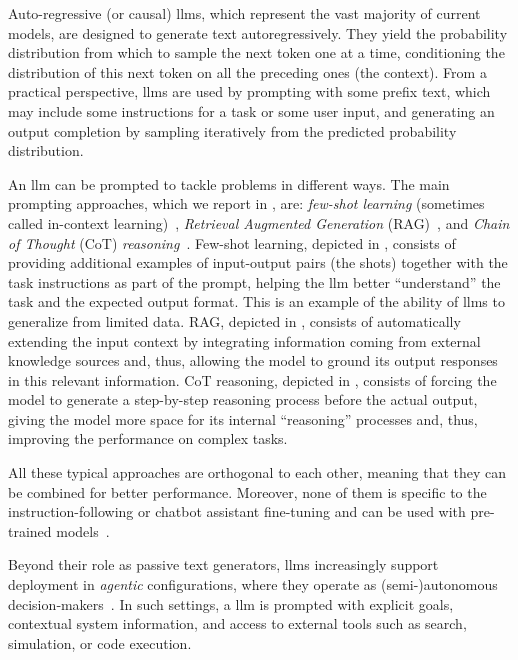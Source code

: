 \documentclass[manuscript,screen]{acmart}
\begin{document}

Auto-regressive (or causal) \acp{llm}, which represent the vast majority of current models, are designed to generate text autoregressively.
They yield the probability distribution from which to sample the next token one at a time, conditioning the distribution of this next token on all the preceding ones (the context).
From a practical perspective, \acp{llm} are used by prompting with some prefix text, which may include some instructions for a task or some user input, and generating an output completion by sampling iteratively from the predicted probability distribution.

An \ac{llm} can be prompted to tackle problems in different ways.
The main prompting approaches, which we report in , are:
\emph{few-shot learning} (sometimes called in-context learning)~\cite{DBLP:conf/nips/BrownMRSKDNSSAA20},
\emph{Retrieval Augmented Generation} (RAG)~\cite{DBLP:journals/corr/abs-2312-10997}, and
\emph{Chain of Thought} (CoT) \emph{reasoning}~\cite{DBLP:conf/nips/KojimaGRMI22}.
Few-shot learning, depicted in , consists of providing additional examples of input-output pairs (the shots) together with the task instructions as part of the prompt, helping the \ac{llm} better \enquote{understand} the task and the expected output format.
This is an example of the ability of \acp{llm} to generalize from limited data.
RAG, depicted in , consists of automatically extending the input context by integrating information coming from external knowledge sources and, thus, allowing the model to ground its output responses in this relevant information.
CoT reasoning, depicted in , consists of forcing the model to generate a step-by-step reasoning process before the actual output, giving the model more space for its internal \enquote{reasoning} processes and, thus, improving the performance on complex tasks.

All these typical approaches are orthogonal to each other, meaning that they can be combined for better performance.
Moreover, none of them is specific to the instruction-following or chatbot assistant fine-tuning and can be used with pre-trained models~\cite{DBLP:conf/nips/BrownMRSKDNSSAA20}.

Beyond their role as passive text generators, \acp{llm} increasingly support deployment in \emph{agentic} configurations, where they operate as (semi-)autonomous decision‑makers~\cite{DBLP:journals/access/AcharyaKB25}. 
In such settings, a \ac{llm} is prompted with explicit goals, contextual system information, and access to external tools such as search, simulation, or code execution. 
\end{document}
